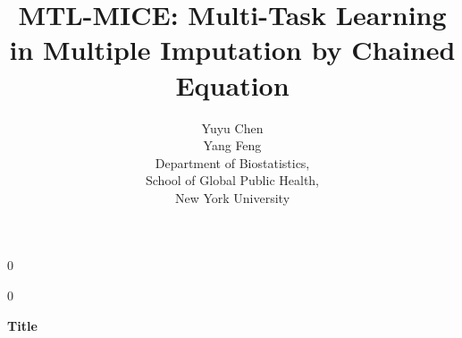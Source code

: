 \documentclass[12pt]{article}
\newcommand{\blind}{0}
\begin{document}
%

\def\spacingset#1{\renewcommand{\baselinestretch}%
{#1}\small\normalsize} \spacingset{1}



\blind
{
  \title{\bf MTL-MICE: Multi-Task Learning in Multiple Imputation by Chained Equation}
  \author{Yuyu Chen\hspace{.2cm}\\
    Yang Feng \\
    Department of Biostatistics, \\
    School of Global Public Health, \\
    New York University}
  \maketitle
} \fi


\blind
{
  \bigskip
  \bigskip
  \bigskip
  \begin{center}
    {\LARGE\bf Title}
\end{center}
  \medskip
} \fi
\end{document}
